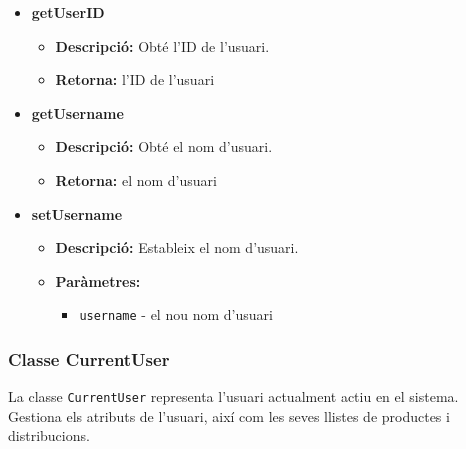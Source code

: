 \documentclass[a4paper, t]{article}
\begin{document}
\begin{itemize}
    \item \textbf{getUserID}
    \begin{itemize}
        \item \textbf{Descripció:} Obté l'ID de l'usuari.
        \item \textbf{Retorna:} l'ID de l'usuari
    \end{itemize}

    \item \textbf{getUsername}
    \begin{itemize}
        \item \textbf{Descripció:} Obté el nom d'usuari.
        \item \textbf{Retorna:} el nom d'usuari
    \end{itemize}

    \item \textbf{setUsername}
    \begin{itemize}
        \item \textbf{Descripció:} Estableix el nom d'usuari.
        \item \textbf{Paràmetres:}
        \begin{itemize}
            \item \texttt{username} - el nou nom d'usuari
        \end{itemize}
    \end{itemize}
\end{itemize}

\subsubsection{Classe CurrentUser}
La classe \texttt{CurrentUser} representa l'usuari actualment actiu en el sistema. Gestiona els atributs de l'usuari, així com les seves llistes de productes i distribucions.
\end{document}
